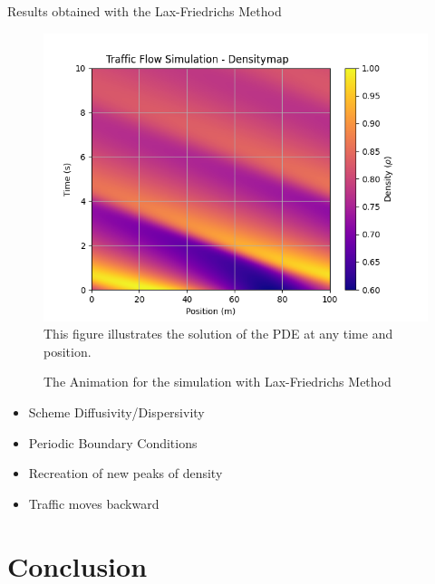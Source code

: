 \documentclass{beamer}
\begin{document}
\begin{frame}{Results obtained with the Lax-Friedrichs Method}
	\vspace{-0.4cm}
	\begin{minipage}[t]{0.48\linewidth}
		\begin{figure}
			\centering
		\includegraphics[width=\linewidth]{traffic_flow_density_map_LF.png}
		\caption{ This figure illustrates the solution of the PDE at any time and position.}
		\label{fig:traffic_flow_density_map_LF}
		\end{figure}
	\end{minipage}
	\hfill
	\begin{minipage}[t]{0.48\linewidth}
		\begin{figure}
			\centering
			\caption{The Animation for the simulation with Lax-Friedrichs Method}
			\label{fig:lax_friedrichs_animation}
		\end{figure}
	\end{minipage}
	\vspace{-0.2cm}
	\begin{block}{}
		\begin{multicols}{2}
			\begin{itemize}
				\small
				\item Scheme Diffusivity/Dispersivity
				\item Periodic Boundary Conditions 
				\item Recreation of new peaks of density
				\item Traffic moves backward
			\end{itemize}
		\end{multicols}
	\end{block}
\end{frame}

\section{Conclusion}
\end{document}
